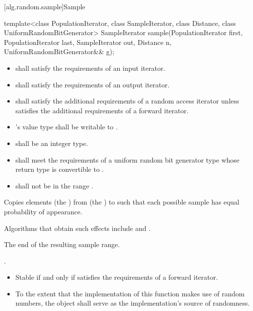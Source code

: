 [alg.random.sample]{Sample}

%
\begin{itemdecl}
template<class PopulationIterator, class SampleIterator,
         class Distance, class UniformRandomBitGenerator>
  SampleIterator sample(PopulationIterator first, PopulationIterator last,
                        SampleIterator out, Distance n,
                        UniformRandomBitGenerator&& g);
\end{itemdecl}

\begin{itemdescr}
\pnum
\requires
\begin{itemize}
\item
{} shall satisfy the requirements of an input iterator.
\item
{} shall satisfy the requirements of an output iterator.
\item
{} shall satisfy the additional requirements of a random access iterator
unless  satisfies the additional requirements of a forward iterator.
\item
{}'s value type shall be writable to .
\item
{} shall be an integer type.
\item
{}
shall meet the requirements of a uniform random bit generator type
whose return type is convertible to .
\item
{} shall not be in the range .
\end{itemize}

\pnum
\effects
Copies  elements (the )
from  (the ) to 
such that each possible sample has equal probability of appearance.
\begin{note}
Algorithms that obtain such effects include 
and .
\end{note}

\pnum
\returns
The end of the resulting sample range.

\pnum
\complexity
{}.

\pnum
\remarks
\begin{itemize}
\item
Stable if and only if  satisfies the
requirements of a forward iterator.
\item
To the extent that the implementation of this function makes use of
random numbers, the object  shall serve as the
implementation's source of randomness.
\end{itemize}
\end{itemdescr}

